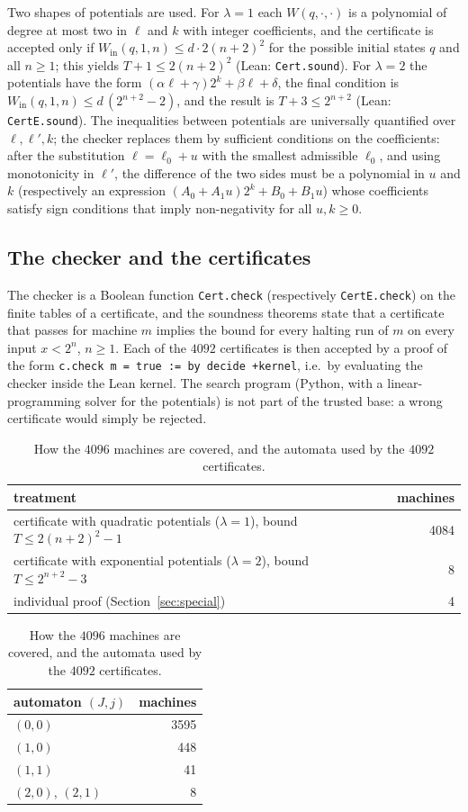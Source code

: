 \documentclass[11pt,a4paper]{amsart}
\theoremstyle{definition}
\theoremstyle{remark}
\newcommand{\lean}[1]{\texttt{#1}}
\begin{document}
Two shapes of potentials are used. For $\lambda=1$ each $W(q,\cdot,\cdot)$ is a polynomial of degree at most two in
$\ell$ and $k$ with integer coefficients, and the certificate is accepted only if
$W_{\mathrm{in}}(q,1,n)\le d\cdot2(n+2)^2$ for the possible initial states $q$ and all $n\ge1$; this yields
$T+1\le2(n+2)^2$ (Lean: \lean{Cert.sound}). For $\lambda=2$ the potentials have the form
$(\alpha\ell+\gamma)2^k+\beta\ell+\delta$, the final condition is $W_{\mathrm{in}}(q,1,n)\le d\,(2^{n+2}-2)$, and
the result is $T+3\le2^{n+2}$ (Lean: \lean{CertE.sound}). The inequalities between potentials are universally
quantified over $\ell,\ell',k$; the checker replaces them by sufficient conditions on the coefficients: after
the substitution $\ell=\ell_0+u$ with the smallest admissible $\ell_0$, and using monotonicity in $\ell'$, the
difference of the two sides must be a polynomial in $u$ and $k$ (respectively an expression
$(A_0+A_1u)2^k+B_0+B_1u$) whose coefficients satisfy sign conditions that imply non-negativity for all
$u,k\ge0$.

\subsection{The checker and the certificates}
The checker is a Boolean function \lean{Cert.check} (respectively \lean{CertE.check}) on the finite tables of
a certificate, and the soundness theorems state that a certificate that passes for machine $m$ implies the
bound for every halting run of $m$ on every input $x<2^n$, $n\ge1$. Each of the $4092$ certificates is then
accepted by a proof of the form \lean{c.check m = true := by decide +kernel}, i.e.\ by evaluating the checker
inside the Lean kernel. The search program (Python, with a linear-programming solver for the potentials) is
not part of the trusted base: a wrong certificate would simply be rejected.

\begin{table}[h]
\centering\small
\begin{tabular}{lr}
\toprule
treatment & machines\\
\midrule
certificate with quadratic potentials ($\lambda=1$), bound $T\le 2(n+2)^2-1$ & 4084\\
certificate with exponential potentials ($\lambda=2$), bound $T\le 2^{n+2}-3$ & 8\\
individual proof (Section~\ref{sec:special}) & 4\\
\bottomrule
\end{tabular}

\medskip
\begin{tabular}{lr}
\toprule
automaton $(J,j)$ & machines\\
\midrule
$(0,0)$ & 3595\\
$(1,0)$ & 448\\
$(1,1)$ & 41\\
$(2,0)$, $(2,1)$ & 8\\
\bottomrule
\end{tabular}
\caption{How the $4096$ machines are covered, and the automata used by the $4092$ certificates.}
\label{tab:stats}
\end{table}
\end{document}
